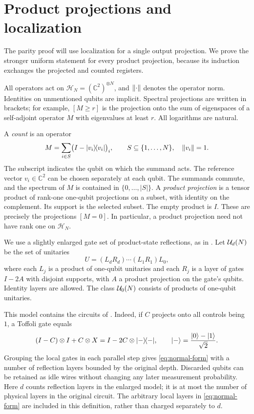 \section{Product projections and localization}
\label{sec:localization}

The parity proof will use localization for a single output projection.
We prove the stronger uniform statement for every product projection,
because its induction exchanges the projected and counted registers.

All operators act on \(\mathcal H_N=(\mathbb C^2)^{\otimes N}\), and
\(\left\lVert \cdot\right\rVert\) denotes the operator norm. Identities on unmentioned
qubits are implicit. Spectral projections are written in brackets;
for example, \([M\ge r]\) is the projection onto the sum of eigenspaces
of a self-adjoint operator \(M\) with eigenvalues at least \(r\).
All logarithms are natural.

A \emph{count} is an operator
\begin{equation}
\label{eq:count}
 M=\sum_{i\in S}\bigl(I-\lvert v_i\rangle\!\langle v_i\rvert\bigr)_i,
 \qquad S\subseteq\{1,\ldots,N\},\quad \left\lVert v_i\right\rVert=1.
\end{equation}
The subscript indicates the qubit on which the summand acts.
The reference vector \(v_i\in\mathbb C^2\) can be chosen separately
at each qubit. The summands commute, and the spectrum of \(M\) is
contained in \(\{0,\ldots,|S|\}\).
A \emph{product projection} is a tensor product of rank-one one-qubit
projections on a subset, with identity on the complement. Its support
is the selected subset. The empty
product is \(I\). These are precisely the projections \([M=0]\).
In particular, a product projection need not have rank one on
\(\mathcal H_N\).

We use a slightly enlarged gate set of product-state reflections, as in
\cite[Section~2 and Proposition~2.1]{Rosenthal2021}.
Let \(\mathcal U_d(N)\) be the set of
unitaries
\begin{equation}
\label{eq:normal-form}
 U=(L_dR_d)\cdots(L_1R_1)L_0,
\end{equation}
where each \(L_j\) is a product of one-qubit unitaries and each \(R_j\)
is a layer of gates \(I-2A\) with disjoint supports, with \(A\) a product
projection on the gate's qubits. Identity layers are allowed.
The class \(\mathcal U_0(N)\) consists of products of one-qubit unitaries.

This model contains the circuits of . Indeed, if
\(C\) projects onto all controls being \(1\), a Toffoli gate equals
\[
 (I-C)\otimes I+C\otimes X
 =I-2C\otimes\lvert -\rangle\!\langle -\rvert,
 \qquad \lvert -\rangle=\frac{\lvert 0\rangle-\lvert 1\rangle}{\sqrt2}.
\]
Grouping the local gates in each parallel step gives
\eqref{eq:normal-form} with a number of reflection layers bounded by
the original depth. Discarded qubits can be retained as idle wires
without changing any later measurement probability. Here $d$ counts
reflection layers in the enlarged model; it is at most the number of
physical layers in the original circuit. The arbitrary local layers in
\eqref{eq:normal-form} are included in this definition, rather than
charged separately to $d$.


